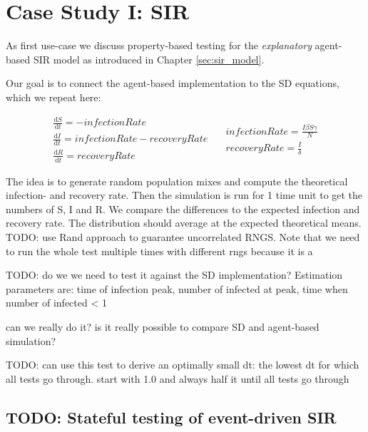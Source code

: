 \section{Case Study I: SIR}
\label{sec:case_SIR}
As first use-case we discuss property-based testing for the \textit{explanatory} agent-based SIR model as introduced in Chapter \ref{sec:sir_model}. 

Our goal is to connect the agent-based implementation to the SD equations, which we repeat here:

\begin{equation}
\begin{split}
\frac{\mathrm d S}{\mathrm d t} = -infectionRate \\
\frac{\mathrm d I}{\mathrm d t} = infectionRate - recoveryRate \\
\frac{\mathrm d R}{\mathrm d t} = recoveryRate 
\end{split}
\quad
\begin{split}
infectionRate = \frac{I \beta S \gamma}{N} \\
recoveryRate = \frac{I}{\delta} 
\end{split}
\end{equation}

The idea is to generate random population mixes and compute the theoretical infection- and recovery rate. Then the simulation is run for 1 time unit to get the numbers of S, I and R. We compare the differences to the expected infection and recovery rate. The distribution should average at the expected theoretical means. TODO: use Rand approach to guarantee uncorrelated RNGS. Note that we need to run the whole test multiple times with different rngs because it is a  

TODO: do we we need to test it against the SD implementation? Estimation parameters are: time of infection peak, number of infected at peak, time when number of infected < 1

can we really do it? is it really possible to compare SD and agent-based simulation? 

TODO: can use this test to derive an optimally small dt: the lowest dt for which all tests go through. start with 1.0 and always half it until all tests go through

\subsection{TODO: Stateful testing of event-driven SIR}